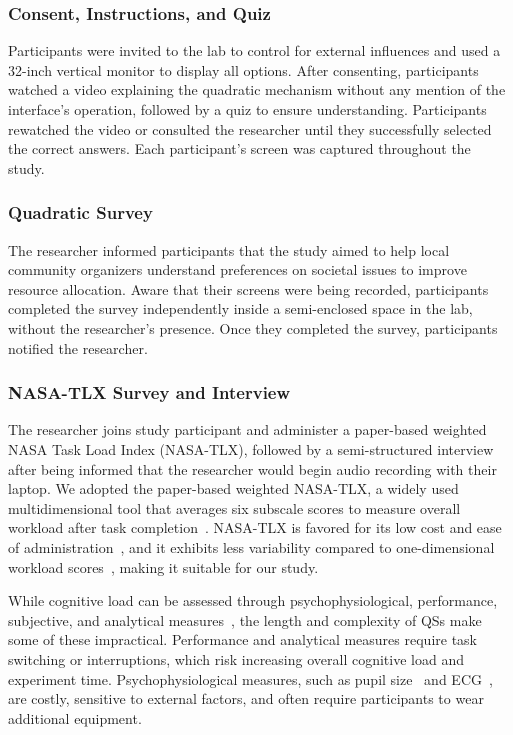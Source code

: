 \subsubsection{Consent, Instructions, and Quiz}
Participants were invited to the lab to control for external influences and used a 32-inch vertical monitor to display all options. After consenting, participants watched a video explaining the quadratic mechanism without any mention of the interface's operation, followed by a quiz to ensure understanding. Participants rewatched the video or consulted the researcher until they successfully selected the correct answers. Each participant's screen was captured throughout the study.

\subsubsection{Quadratic Survey}
The researcher informed participants that the study aimed to help local community organizers understand preferences on societal issues to improve resource allocation. Aware that their screens were being recorded, participants completed the survey independently inside a semi-enclosed space in the lab, without the researcher's presence. Once they completed the survey, participants notified the researcher.

\subsubsection{NASA-TLX Survey and Interview}
The researcher joins study participant and administer a paper-based weighted NASA Task Load Index (NASA-TLX), followed by a semi-structured interview after being informed that the researcher would begin audio recording with their laptop. We adopted the paper-based weighted NASA-TLX, a widely used multidimensional tool that averages six subscale scores to measure overall workload after task completion~\cite{hart1988development, hartNasaTaskLoadIndex2006, cain2007review}. NASA-TLX is favored for its low cost and ease of administration~\cite{gaoMentalWorkloadMeasurement2013}, and it exhibits less variability compared to one-dimensional workload scores~\cite{rubioEvaluationSubjectiveMental2004}, making it suitable for our study. 

While cognitive load can be assessed through psychophysiological, performance, subjective, and analytical measures~\cite{gaoMentalWorkloadMeasurement2013}, the length and complexity of QSs make some of these impractical. Performance and analytical measures require task switching or interruptions, which risk increasing overall cognitive load and experiment time. Psychophysiological measures, such as pupil size~\cite{palinkoEstimatingCognitiveLoad2010} and ECG~\cite{haapalainenPsychophysiologicalMeasuresAssessing2010}, are costly, sensitive to external factors, and often require participants to wear additional equipment.

